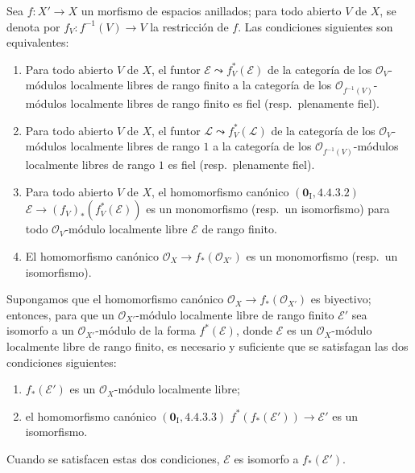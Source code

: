 \begin{lemma}[21.13.2]
\label{IV.21.13.2}
Sea $f:X'\to X$ un morfismo de espacios anillados; para todo abierto $V$ de $X$,
se denota por $f_V:f^{-1}(V)\to V$ la restricción de $f$. Las condiciones siguientes son
equivalentes:
\begin{enumerate}[label=\emph{\alph*)}]
  \item Para todo abierto $V$ de $X$, el funtor
  $\mathscr E\leadsto f_V^*(\mathscr E)$ de la categoría de los $\mathcal O_V$-módulos
  localmente libres de rango finito a la categoría de los
  $\mathcal O_{f^{-1}(V)}$-módulos localmente libres de rango finito es fiel
  \textup{(resp.}\ plenamente fiel\textup{)}.
  \item[\emph{a')}] Para todo abierto $V$ de $X$, el funtor
  $\mathscr L\leadsto f_V^*(\mathscr L)$ de la categoría de los $\mathcal O_V$-módulos
  localmente libres de rango $1$ a la categoría de los
  $\mathcal O_{f^{-1}(V)}$-módulos localmente libres de rango $1$ es fiel
  \textup{(resp.}\ plenamente fiel\textup{)}.
  \item Para todo abierto $V$ de $X$, el homomorfismo canónico
  $(\mathbf 0_{\mathrm I}, 4.4.3.2)$
  $\mathscr E\to(f_V)_*(f_V^*(\mathscr E))$ es un monomorfismo
  \textup{(resp.}\ un isomorfismo\textup{)} para todo $\mathcal O_V$-módulo localmente libre
  $\mathscr E$ de rango finito.
  \item[\emph{b')}] El homomorfismo canónico
  $\mathcal O_X\to f_*(\mathcal O_{X'})$ es un monomorfismo
  \textup{(resp.}\ un isomorfismo\textup{)}.
\end{enumerate}

Supongamos que el homomorfismo canónico $\mathcal O_X\to f_*(\mathcal O_{X'})$ es
biyectivo; entonces, para que un $\mathcal O_{X'}$-módulo localmente libre de rango finito
$\mathscr E'$ sea isomorfo a un $\mathcal O_{X'}$-módulo de la forma
$f^*(\mathscr E)$, donde $\mathscr E$ es un $\mathcal O_X$-módulo localmente libre de
rango finito, es necesario y suficiente que se satisfagan las dos condiciones siguientes:
\begin{enumerate}[label=\textup{(\roman*)}]
  \item $f_*(\mathscr E')$ es un $\mathcal O_X$-módulo localmente libre;
  \item el homomorfismo canónico $(\mathbf 0_{\mathrm I}, 4.4.3.3)$
  $f^*(f_*(\mathscr E'))\to\mathscr E'$ es un isomorfismo.
\end{enumerate}
Cuando se satisfacen estas dos condiciones, $\mathscr E$ es isomorfo a
$f_*(\mathscr E')$.
\end{lemma}

